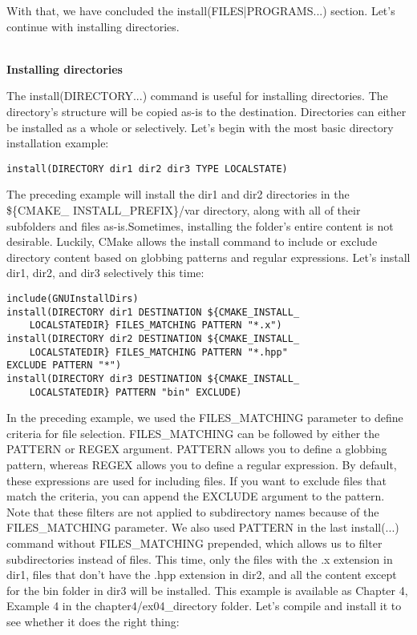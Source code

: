 
With that, we have concluded the install(FILES|PROGRAMS...) section. Let's continue with installing directories.

\hspace*{\fill} \\ %
\noindent
\textbf{Installing directories}

The install(DIRECTORY...) command is useful for installing directories. The directory's structure will be copied as-is to the destination. Directories can either be installed as a whole or selectively. Let's begin with the most basic directory installation example:

\begin{lstlisting}[style=styleCMake]
install(DIRECTORY dir1 dir2 dir3 TYPE LOCALSTATE)
\end{lstlisting}

The preceding example will install the dir1 and dir2 directories in the \$\{CMAKE\_	INSTALL\_PREFIX\}/var directory, along with all of their subfolders and files as-is.Sometimes, installing the folder's entire content is not desirable. Luckily, CMake allows the install command to include or exclude directory content based on globbing patterns and regular expressions. Let's install dir1, dir2, and dir3 selectively this time:

\begin{lstlisting}[style=styleCMake]
include(GNUInstallDirs)
install(DIRECTORY dir1 DESTINATION ${CMAKE_INSTALL_
	LOCALSTATEDIR} FILES_MATCHING PATTERN "*.x")
install(DIRECTORY dir2 DESTINATION ${CMAKE_INSTALL_
	LOCALSTATEDIR} FILES_MATCHING PATTERN "*.hpp"
EXCLUDE PATTERN "*")
install(DIRECTORY dir3 DESTINATION ${CMAKE_INSTALL_
	LOCALSTATEDIR} PATTERN "bin" EXCLUDE)
\end{lstlisting}

In the preceding example, we used the FILES\_MATCHING parameter to define criteria for file selection. FILES\_MATCHING can be followed by either the PATTERN or REGEX argument. PATTERN allows you to define a globbing pattern, whereas REGEX allows you to define a regular expression. By default, these expressions are used for including files. If you want to exclude files that match the criteria, you can append the EXCLUDE argument to the pattern. Note that these filters are not applied to subdirectory names because of the FILES\_MATCHING parameter. We also used PATTERN in the last install(...) command without FILES\_MATCHING prepended, which allows us to filter subdirectories instead of files. This time, only the files with the .x extension in dir1, files that don't have the .hpp extension in dir2, and all the content except for the bin folder in dir3 will be installed. This example is available as Chapter 4, Example 4 in the chapter4/ex04\_directory folder. Let's compile and install it to see whether it does the right thing:

